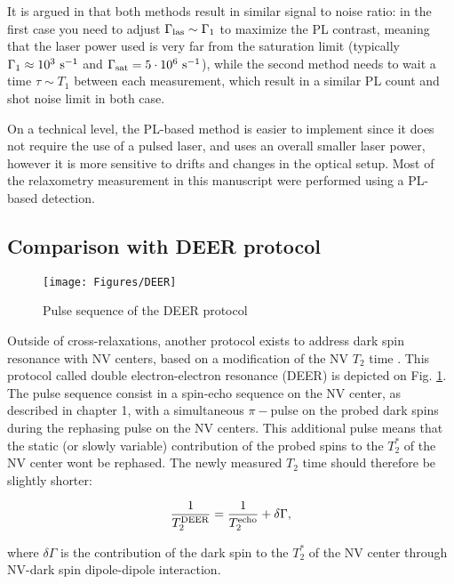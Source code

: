 \documentclass[a4paper]{report}
\begin{document}
It is argued in \citep{finco2021imaging} that both methods result in similar signal to noise ratio: in the first case you need to adjust $\Gamma_{\rm las} \sim \Gamma_1$ to maximize the PL contrast, meaning that the laser power used is very far from the saturation limit (typically $\Gamma_1 \approx 10^3\ \rm s^{-1}$ and $\Gamma_{\rm sat} = 5\cdot10^6\ \rm s^{-1}$\citep{dreau2011avoiding}), while the second method needs to wait a time $\tau \sim T_1$ between each measurement, which result in a similar PL count and shot noise limit in both case.

On a technical level, the PL-based method is easier to implement since it does not require the use of a pulsed laser, and uses an overall smaller laser power, however it is more sensitive to drifts and changes in the optical setup. Most of the relaxometry measurement in this manuscript were performed using a PL-based detection.

\subsection{Comparison with DEER protocol}

\begin{figure}[h]
\centering
\texttt{[image: Figures/DEER]}
\caption{Pulse sequence of the DEER protocol}
\label{DEER}
\end{figure}

Outside of cross-relaxations, another protocol exists to address dark spin resonance with NV centers, based on a modification of the NV $T_2$ time \citep{serbyn2014interferometric}. This protocol called double electron-electron resonance (DEER) is depicted on Fig. \ref{DEER}. The pulse sequence consist in a spin-echo sequence on the NV center, as described in chapter 1, with a simultaneous $\pi-$pulse on the probed dark spins during the rephasing pulse on the NV centers. This additional pulse means that the static (or slowly variable) contribution of the probed spins to the $T_2^*$ of the NV center wont be rephased. The newly measured $T_2$ time should therefore be slightly shorter:

\begin{equation}
\frac{1}{T_2^{\rm DEER}}=\frac{1}{T_2^{\rm echo}} + \delta \Gamma,
\end{equation}

where $\delta \Gamma$ is the contribution of the dark spin to the $T_2^*$ of the NV center through NV-dark spin dipole-dipole interaction.
\end{document}
